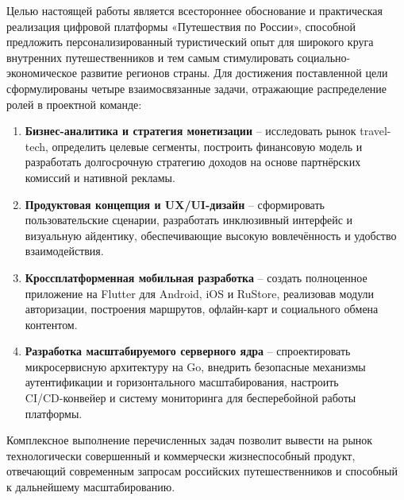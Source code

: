 Целью настоящей работы является всестороннее обоснование и практическая реализация цифровой платформы «Путешествия по России», способной предложить персонализированный туристический опыт для широкого круга внутренних путешественников и тем самым стимулировать социально-экономическое развитие регионов страны.
Для достижения поставленной цели сформулированы четыре взаимосвязанные задачи, отражающие распределение ролей в проектной команде:
\begin{enumerate}
    \item \textbf{Бизнес-аналитика и стратегия монетизации} – исследовать рынок travel-tech, определить целевые сегменты, построить финансовую модель и разработать долгосрочную стратегию доходов на основе партнёрских комиссий и нативной рекламы.
    \item \textbf{Продуктовая концепция и UX/UI-дизайн} – сформировать пользовательские сценарии, разработать инклюзивный интерфейс и визуальную айдентику, обеспечивающие высокую вовлечённость и удобство взаимодействия.
    \item \textbf{Кроссплатформенная мобильная разработка} – создать полноценное приложение на Flutter для Android, iOS и RuStore, реализовав модули авторизации, построения маршрутов, офлайн-карт и социального обмена контентом.
    \item \textbf{Разработка масштабируемого серверного ядра} – спроектировать микросервисную архитектуру на Go, внедрить безопасные механизмы аутентификации и горизонтального масштабирования, настроить \\ CI/CD-конвейер и систему мониторинга для бесперебойной работы платформы.
\end{enumerate}

Комплексное выполнение перечисленных задач позволит вывести на рынок технологически совершенный и коммерчески жизнеспособный продукт, отвечающий современным запросам российских путешественников и способный к дальнейшему масштабированию.

